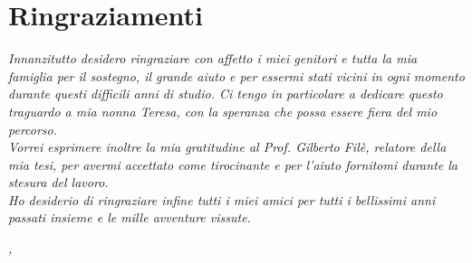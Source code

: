 
\cleardoublepage
{}
{}


\bigskip

\begingroup
\let\clearpage\relax
\let\cleardoublepage\relax
\let\cleardoublepage\relax

\chapter*{Ringraziamenti}

\noindent \textit{Innanzitutto desidero ringraziare con affetto i miei genitori e tutta la mia famiglia per il sostegno, il grande aiuto e per essermi stati vicini in ogni momento durante questi difficili anni di studio. Ci tengo in particolare a dedicare questo traguardo a mia nonna Teresa, con la speranza che possa essere fiera del mio percorso.}\\

\noindent \textit{Vorrei esprimere inoltre la mia gratitudine al Prof. Gilberto Filè, relatore della mia tesi, per avermi accettato come tirocinante e per l'aiuto fornitomi durante la stesura del lavoro.}\\

\noindent \textit{Ho desiderio di ringraziare infine tutti i miei amici per tutti i bellissimi anni passati insieme e le mille avventure vissute.}\\
\bigskip

\noindent\textit{\myLocation, \myTime}
\hfill \myName

\endgroup

